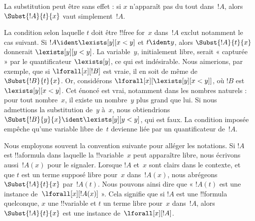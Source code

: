\documentclass[../../../include/open-logic-section]{subfiles}
\begin{document}
\begin{explain}
La substitution peut être sans effet : si $x$ n'apparaît pas du tout
dans~$!A$, alors $\Subst{!A}{t}{x}$ vaut simplement~$!A$.

La condition selon laquelle $t$ doit être !!{free for}~$x$ dans~$!A$
exclut notamment le cas suivant. Si
$!A \ident \lexists[y][x < y]$ et $t \ident y$, alors
$\Subst{!A}{t}{x}$ donnerait $\lexists[y][y < y]$. La variable~$y$,
initialement libre, serait « capturée » par le quantificateur
$\lexists[y]$, ce qui est indésirable. Nous aimerions, par exemple,
que si $\lforall[x][!B]$ est vraie, il en soit de même de
$\Subst{!B}{t}{x}$. Or, considérons
$\lforall[x][\lexists[y][x < y]]$, où $!B$ est
$\lexists[y][x < y]$. Cet énoncé est vrai, notamment dans les nombres
naturels : pour tout nombre~$x$, il existe un nombre~$y$ plus grand
que lui. Si nous admettions la substitution de~$y$ à~$x$, nous
obtiendrions $\Subst{!B}{y}{x} \ident \lexists[y][y < y]$, qui est
faux. La condition imposée empêche qu'une variable libre de~$t$
devienne liée par un quantificateur de~$!A$.
\end{explain}

Nous employons souvent la convention suivante pour alléger les
notations. Si $!A$ est !!a{formula} dans laquelle la !!{variable}~$x$
peut apparaître libre, nous écrivons aussi~$!A(x)$ pour le signaler.
Lorsque $!A$ et~$x$ sont clairs dans le contexte, et que $t$ est un
terme supposé libre pour~$x$ dans~$!A(x)$, nous abrégeons
$\Subst{!A}{t}{x}$ par~$!A(t)$. Nous pouvons ainsi dire que « $!A(t)$
est une instance de~$\lforall[x][!A(x)]$ ». Cela signifie que si
$!A$ est une !!{formula} quelconque, $x$ une !!{variable} et $t$ un
terme libre pour~$x$ dans~$!A$, alors $\Subst{!A}{t}{x}$ est une
instance de~$\lforall[x][!A]$.
\end{document}
